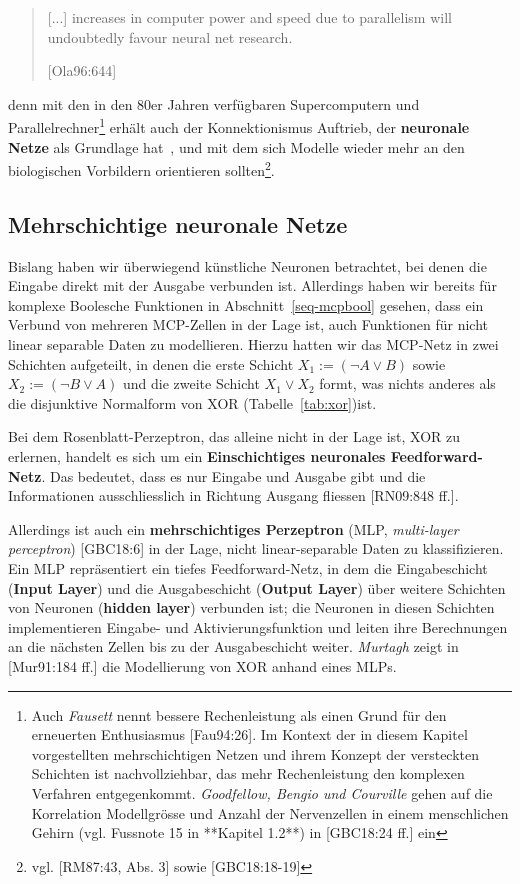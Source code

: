 \blockquote[{[Ola96:644]}]{
    [...] increases in computer power and speed due to parallelism will undoubtedly favour neural net research.
}

denn mit den in den 80er Jahren verfügbaren Supercomputern und Parallelrechner\footnote{
    Auch \textit{Fausett} nennt bessere Rechenleistung als einen Grund für den erneuerten Enthusiasmus [Fau94:26]. Im Kontext der in diesem Kapitel vorgestellten mehrschichtigen Netzen und ihrem Konzept der versteckten Schichten ist nachvollziehbar, das mehr Rechenleistung den komplexen Verfahren entgegenkommt. \textit{Goodfellow, Bengio und Courville} gehen auf die Korrelation Modellgrösse und Anzahl der Nervenzellen in einem menschlichen Gehirn (vgl. Fussnote 15 in **Kapitel 1.2**) in [GBC18:24 ff.] ein
} erhält auch der Konnektionismus Auftrieb, der \textbf{neuronale Netze} als Grundlage hat~\cite[15]{Dor91}, und mit dem sich Modelle wieder mehr an den biologischen Vorbildern orientieren sollten\footnote{
    vgl. [RM87:43, Abs. 3] sowie [GBC18:18-19]}.


\subsection{Mehrschichtige neuronale Netze}

Bislang haben wir überwiegend künstliche Neuronen betrachtet, bei denen die Eingabe direkt mit der Ausgabe verbunden ist. Allerdings haben wir bereits für komplexe Boolesche Funktionen in Abschnitt~\ref{seq-mcpbool} gesehen, dass ein Verbund von mehreren MCP-Zellen in der Lage ist, auch Funktionen für nicht linear separable Daten zu modellieren. Hierzu hatten wir das MCP-Netz in zwei Schichten aufgeteilt, in denen die erste Schicht $X_1 := (\neg A \lor B)$ sowie $X_2 := (\neg B \lor A)$ und die zweite Schicht $X_1 \lor X_2$ formt, was nichts anderes als die disjunktive Normalform von XOR (Tabelle~\ref{tab:xor})ist.

Bei dem Rosenblatt-Perzeptron, das alleine nicht in der Lage ist, XOR zu erlernen, handelt es sich um ein \textbf{Einschichtiges neuronales Feedforward-Netz}.
Das bedeutet, dass es nur Eingabe und Ausgabe gibt und die Informationen ausschliesslich in Richtung Ausgang fliessen [RN09:848 ff.].

Allerdings ist auch ein \textbf{mehrschichtiges Perzeptron} (MLP, \textit{multi-layer perceptron}) [GBC18:6] in der Lage, nicht linear-separable Daten zu klassifizieren.
Ein MLP repräsentiert ein tiefes Feedforward-Netz, in dem die Eingabeschicht (\textbf{Input Layer}) und die Ausgabeschicht (\textbf{Output Layer}) über weitere Schichten von Neuronen (\textbf{hidden layer}) verbunden ist; die Neuronen in diesen Schichten implementieren Eingabe- und Aktivierungsfunktion und leiten ihre Berechnungen an die nächsten Zellen bis zu der Ausgabeschicht weiter. \textit{Murtagh} zeigt in [Mur91:184 ff.] die Modellierung von XOR anhand eines MLPs.

